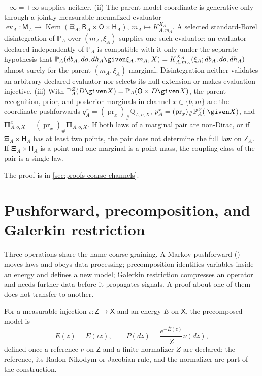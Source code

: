 $+\infty=+\infty$ supplies neither. (ii) The parent model coordinate is generative only through a
jointly measurable normalized evaluator
$\operatorname{ev}_A:\mathsf M_A\to\operatorname{Kern}(\boldsymbol\Xi_A,\mathsf B_A\times\mathsf
O\times\mathsf H_A)$, $m_A\mapsto K^{X_A}_{A,m_A}$. A selected standard-Borel disintegration of
$\mathbb P_A$ over $(m_A,\xi_A)$ supplies one such evaluator; an evaluator declared independently of
$\mathbb P_A$ is compatible with it only under the separate hypothesis that
$\mathbb P_A(db_A,do,dh_A\given\xi_A,m_A,X)=K^{X_A}_{A,m_A}(\xi_A;db_A,do,dh_A)$ almost surely for
the parent $(m_A,\xi_A)$ marginal. Disintegration neither validates an arbitrary declared
evaluator nor selects its null extension or makes evaluation injective. (iii) With
$\mathbb P^Z_A(D\given X)=\mathbb P_A(\mathsf O\times D\given X)$, the parent recognition, prior, and
posterior marginals in channel $x\in\{b,m\}$ are the coordinate pushforwards
$q_A^x=(\operatorname{pr}_x)_\#\mathbb Q_{A,o,X}$,
$p_A^x=(\operatorname{pr}_x)_\#\mathbb P^Z_A(\cdot\given X)$, and
$\boldsymbol\Pi^x_{A,o,X}=(\operatorname{pr}_x)_\#\boldsymbol\Pi_{A,o,X}$. If both laws of a
marginal pair are non-Dirac, or if $\boldsymbol\Xi_A\times\mathsf H_A$ has at least two points, the
pair does not determine the full law on $\mathsf Z_A$. If $\boldsymbol\Xi_A\times\mathsf H_A$ is a
point and one marginal is a point mass, the coupling class of the pair is a single law.

The proof is in \cref{sec:proofs-coarse-channels}.

\section{Pushforward, precomposition, and Galerkin restriction}
\label{sec:cg-three-operations}

Three operations share the name coarse-graining. A Markov pushforward
() moves laws and obeys data processing; precomposition identifies
variables inside an energy and defines a new model; Galerkin restriction compresses an operator and
needs further data before it propagates signals. A proof about one of them does not transfer to
another.

For a measurable injection $\iota:\mathsf Z\to\mathsf X$ and an energy $E$ on $\mathsf X$, the
precomposed model is
\begin{equation}
\bar E(z)=E(\iota z),
\qquad
\bar P(dz)=\frac{e^{-\bar E(z)}}{\bar Z}\bar\nu(dz),
\label{eq:cg-energy-precomposition}
\end{equation}
defined once a reference $\bar\nu$ on $\mathsf Z$ and a finite normalizer $\bar Z$ are declared;
the reference, its Radon-Nikodym or Jacobian rule, and the normalizer are part of the construction.


